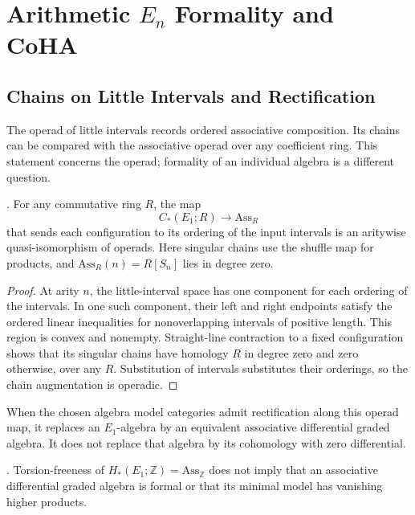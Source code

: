\chapter{Arithmetic \(E_{n}\) Formality and CoHA}
\label{v4-arith:kontsevich-soibelman}

\section{Chains on Little Intervals and Rectification}
\label{v4-arith:ks:E1-automatic}

The operad of little intervals records ordered associative
composition. Its chains can be compared with the associative operad
over any coefficient ring. This statement concerns the operad;
formality of an individual algebra is a different question.

\begin{theorem}
\label{v4-arith:thm:E1-formality-automatic}
\ClaimStatusProvedHere. For any commutative ring \(R\), the map
\[
 C_*(E_1;R)\longrightarrow\mathrm{Ass}_R
\]
that sends each configuration to its ordering of the input intervals
is an aritywise quasi-isomorphism of operads. Here singular chains
use the shuffle map for products, and
\(\mathrm{Ass}_R(n)=R[S_n]\) lies in degree zero.
\end{theorem}

\begin{proof}
At arity \(n\), the little-interval space has one component for each
ordering of the intervals. In one such component, their left and
right endpoints satisfy the ordered linear inequalities for
nonoverlapping intervals of positive length. This region is convex
and nonempty. Straight-line contraction to a fixed configuration
shows that its singular chains have homology \(R\) in degree zero
and zero otherwise, over any \(R\). Substitution of intervals
substitutes their orderings, so the chain augmentation is operadic.
\end{proof}

When the chosen algebra model categories admit rectification along
this operad map, it replaces an \(E_1\)-algebra by an equivalent
associative differential graded algebra. It does not replace that
algebra by its cohomology with zero differential.

\begin{corollary}
\label{v4-arith:cor:ordered-E1-survives}
\ClaimStatusProvedHere. Torsion-freeness of
\(H_*(E_1;\mathbb Z)=\mathrm{Ass}_{\mathbb Z}\) does not imply
that an associative differential graded algebra is formal or that
its minimal model has vanishing higher products.
\end{corollary}

